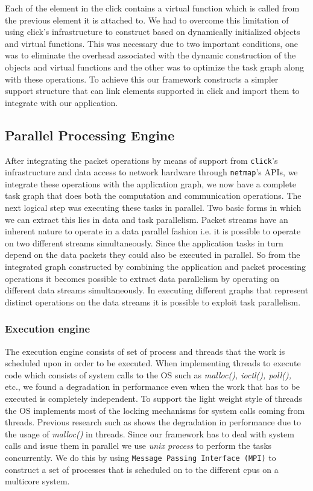 \documentclass[conference]{IEEEtran}
\begin{document}
Each of the element in the click contains a virtual function which is called from the previous element it is attached to. We had to overcome this limitation of using click's infrastructure to construct based on dynamically initialized objects and virtual functions. This was necessary due to two important conditions, one was to eliminate the overhead associated with the dynamic construction of the objects and virtual functions and the other was to optimize the task graph along with these operations. To achieve this our framework constructs a simpler support structure that can link elements supported in click and import them to integrate with our application.

\subsection{Parallel Processing Engine}

After integrating the packet operations by means of support from \texttt{click}'s infrastructure and data access to network hardware through \texttt{netmap}'s APIs, we integrate these operations with the application graph, we now have a complete task graph that does both the computation and communication operations. The next logical step was executing these tasks in parallel. Two basic forms in which we can extract this lies in data and task parallelism. Packet streams have an inherent nature to operate in a data parallel fashion i.e. it is possible to operate on two different streams simultaneously. Since the application tasks in turn depend on the data packets they could also be executed in parallel. So from the integrated graph constructed by combining the application and packet processing operations it becomes possible to extract data parallelism by operating on different data streams simultaneously. In executing different graphs that represent distinct operations on the data streams it is possible to exploit task parallelism.

\subsubsection{Execution engine}
\label{ppe}

The execution engine consists of set of process and threads that the work is scheduled upon in order to be executed. When implementing threads to execute code which consists of system calls to the OS such as \textit{malloc(), ioctl(), poll(),} etc., we found a degradation in performance even when the work that has to be executed is completely independent. To support the light weight style of threads the OS implements most of the locking mechanisms for system calls coming from threads. Previous research such as \cite{Lever:2000:MPM:1267724.1267780} \cite{Dice:2002:MLM:773039.512451} \cite{Michael:2004:SLD:996893.996848} shows the degradation in performance due to the usage of \textit{malloc()} in threads. Since our framework has to deal with system calls and issue them in parallel we use \textit{unix process} to perform the tasks concurrently. We do this by using \texttt{Message Passing Interface (MPI)} \cite{TheMPIForum:1993:MMP:169627.169855} to construct a set of processes that is scheduled on to the different cpus on a multicore system.
\end{document}
